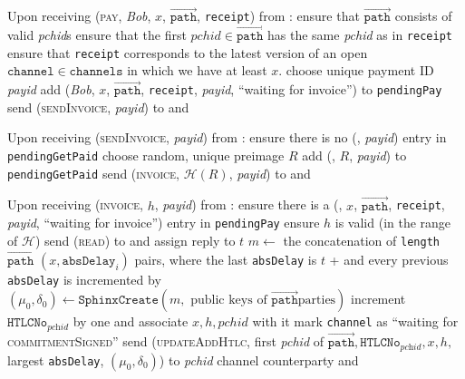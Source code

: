 \begin{algorithmic}[1]
    \State {}
    \State Upon receiving (\textsc{pay}, \textit{Bob}, $x$,
    $\overrightarrow{\mathtt{path}}$, \texttt{receipt}) from \environment:
    \Indent
      \State ensure that $\overrightarrow{\mathtt{path}}$ consists of valid
      \textit{pchid}s
      \State ensure that the first $\mathit{pchid} \in
      \overrightarrow{\mathtt{path}}$ has the same \textit{pchid} as in
      \texttt{receipt}
      \State ensure that \texttt{receipt} corresponds to the latest version of
      an open $\mathtt{channel} \in \mathtt{channels}$ in which we have at least
      $x$.
      \State choose unique payment ID \textit{payid} 
      \State add (\textit{Bob}, $x$, $\overrightarrow{\mathtt{path}}$,
      \texttt{receipt}, \textit{payid}, ``waiting for invoice'') to
      \texttt{pendingPay}
      \State send (\textsc{sendInvoice}, \textit{payid}) to \bob{} and
      \adversary
    \EndIndent
    \State

    \State Upon receiving (\textsc{sendInvoice}, \textit{payid}) from \bob:
    \Indent
      \State ensure there is no (\bob, \textit{payid}) entry in
      \texttt{pendingGetPaid}
      \State choose random, unique preimage $R$
      \State add (\bob, $R$, \textit{payid}) to \texttt{pendingGetPaid}
      \State send (\textsc{invoice}, $\mathcal{H}\left(R\right)$,
      \textit{payid}) to \bob{} and \adversary
    \EndIndent
    \State

    \State Upon receiving (\textsc{invoice}, $h$, \textit{payid}) from \bob:
    \Indent
      \State ensure there is a (\bob, $x$, $\overrightarrow{\mathtt{path}}$,
      \texttt{receipt}, \textit{payid}, ``waiting for invoice'') entry in
      \texttt{pendingPay}
      \State ensure $h$ is valid (in the range of $\mathcal{H}$)
      \State send (\textsc{read}) to \clock{} and assign reply to $t$
      \State $m \gets$ the concatenation of \texttt{length}
      $\overrightarrow{\mathtt{path}}$ $\left(x, \mathtt{absDelay}_i\right)$
      pairs, where the last \texttt{absDelay} is $t$ +  and
      every previous \texttt{absDelay} is incremented by 
      \State $\left(\mu_0, \delta_0\right) \gets \mathtt{SphinxCreate}\left(m,
      \text{ public keys of } \overrightarrow{\mathtt{path}} \text{
      parties}\right)$
      \State increment $\mathtt{HTLCNo}_{\textit{pchid}}$ by one and associate
      $x, h, \mathit{pchid}$ with it
      \State mark \texttt{channel} as ``waiting for \textsc{commitmentSigned}''
      \State send (\textsc{updateAddHtlc}, first \textit{pchid} of
      $\overrightarrow{\mathtt{path}}, \mathtt{HTLCNo}_{\textit{pchid}}, x, h,$
      largest \texttt{absDelay}, $\left(\mu_0, \delta_0\right)$) to
      \textit{pchid} channel counterparty and \adversary
    \EndIndent
    \State


\end{algorithmic}
